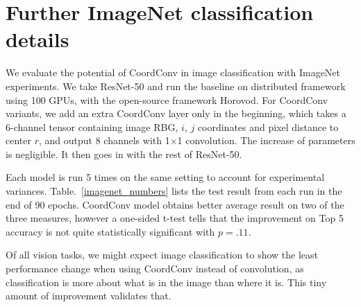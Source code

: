 \documentclass{article}
\begin{document}



\section{Further ImageNet classification details}

We evaluate the potential of CoordConv in image classification with ImageNet experiments. We take ResNet-50 and run the baseline on distributed framework using 100 GPUs, with the open-source framework Horovod. For CoordConv variants, we add an extra CoordConv layer only in the beginning, which takes a 6-channel tensor containing image RBG, $i$, $j$ coordinates and pixel distance to center $r$, and output 8 channels with 1$\times$1 convolution. The increase of parameters is negligible. It then goes in with the rest of ResNet-50.

Each model is run 5 times on the same setting to account for experimental variances. Table.~\ref{imagenet_numbers} lists the test result from each run in the end of 90 epochs. CoordConv model obtains better average result on two of the three measures, however a one-sided t-test tells that the improvement on Top 5 accuracy is not quite statistically significant with $p=.11$. 

Of all vision tasks, we might expect image classification to show the least performance change when using CoordConv instead of convolution, as classification is more about what is in the image than where it is. This tiny amount of improvement validates that.
\end{document}
